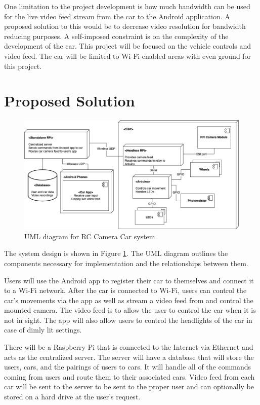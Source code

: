 \documentclass[letterpaper,12pt]{report}
\begin{document}
	One limitation to the project development is how much bandwidth can be used
	for the live video feed stream from the car to the Android application. A
	proposed solution to this would be to decrease video resolution for
	bandwidth reducing purposes. A self-imposed constraint is on the complexity
	of the development of the car. This project will be focused on the vehicle
	controls and video feed. The car will be limited to Wi-Fi-enabled areas with
	even ground for this project.

	\section*{Proposed Solution}
	\markright{}

	\begin{figure}[H]
    	\centering
		\includegraphics[width=\linewidth]{diagrams/Proposal_UML_Diagram.png}
    	\caption{UML diagram for RC Camera Car system}
    	\label{fig:uml}
	\end{figure}

	The system design is shown in Figure \ref{fig:uml}. The UML diagram outlines
	the components necessary for implementation and the relationships between
	them. 

	Users will use the Android app to register their car to themselves and
	connect it to a Wi-Fi network. After the car is connected to Wi-Fi, users
	can control the car’s movements via the app as well as stream a video feed
	from and control the mounted camera. The video feed is to allow the user to
	control the car when it is not in sight. The app will also allow users to
	control the headlights of the car in case of dimly lit settings.

	There will be a Raspberry Pi that is connected to the Internet via Ethernet
	and acts as the centralized server. The server will have a database that
	will store the users, cars, and the pairings of users to cars. It will
	handle all of the commands coming from users and route them to their
	associated cars. Video feed from each car will be sent to the server to be
	sent to the proper user and can optionally be stored on a hard drive at the
	user’s request.
\end{document}
